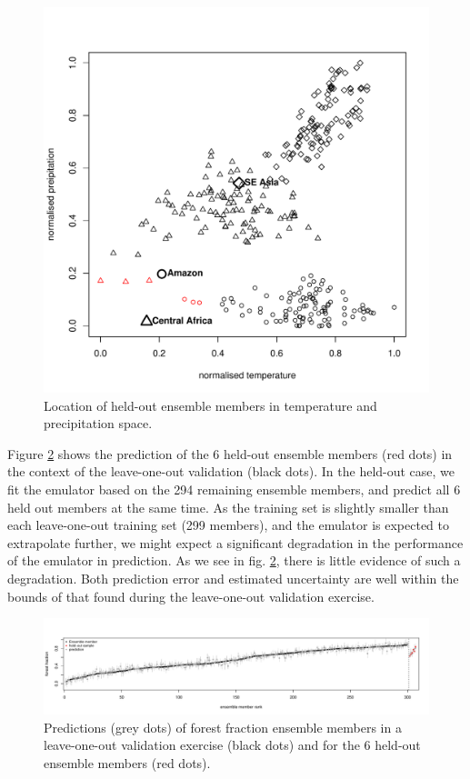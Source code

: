 \documentclass[gmd, manuscript]{copernicus} %
\begin{document}
\begin{figure}[t]
\includegraphics[width=12cm]{../graphics/holdout1_location.pdf}
\caption{Location of held-out ensemble members in temperature and precipitation space.}
\label{fig:holdout1_location}
\end{figure}


Figure \ref{fig:holdout1_vs_loo} shows the prediction of the 6 held-out ensemble members (red dots) in the context of the leave-one-out validation (black dots). In the held-out case, we fit the emulator based on the 294 remaining ensemble members, and predict all 6 held out members at the same time. As the training set is slightly smaller than each leave-one-out training set (299 members), and the emulator is expected to extrapolate further, we might expect a significant degradation in the performance of the emulator in prediction. As we see in fig. \ref{fig:holdout1_vs_loo}, there is little evidence of such a degradation. Both prediction error and estimated uncertainty are well within the bounds of that found during the leave-one-out validation exercise.

\begin{figure}[t]
\includegraphics[width=15cm]{../graphics/holdout1_vs_loo.pdf}
\caption{Predictions (grey dots) of forest fraction ensemble members in a leave-one-out validation exercise (black dots) and for the 6 held-out ensemble members (red dots).}
\label{fig:holdout1_vs_loo}
\end{figure}
\end{document}
